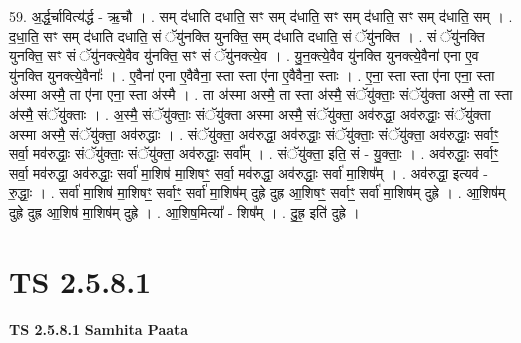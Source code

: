 \documentclass[17pt]{extarticle}
\begin{document}
59. अ॒र्द्ध॒र्चावित्य॑र्द्ध - ऋ॒चौ । . सम् द॑धाति दधाति॒ सꣳ सम् द॑धाति॒ सꣳ सम् द॑धाति॒ सꣳ सम् द॑धाति॒ सम् । . द॒धा॒ति॒ सꣳ सम् द॑धाति दधाति॒ सं ॅयु॑नक्ति युनक्ति॒ सम् द॑धाति दधाति॒ सं ॅयु॑नक्ति । . सं ॅयु॑नक्ति युनक्ति॒ सꣳ सं ॅयु॑नक्त्ये॒वैव यु॑नक्ति॒ सꣳ सं ॅयु॑नक्त्ये॒व । . यु॒न॒क्त्ये॒वैव यु॑नक्ति युनक्त्ये॒वैना॑ एना ए॒व यु॑नक्ति युनक्त्ये॒वैनाः᳚ । . ए॒वैना॑ एना ए॒वैवैना॒ स्ता स्ता ए॑ना ए॒वैवैना॒ स्ताः । . ए॒ना॒ स्ता स्ता ए॑ना एना॒ स्ता अ॑स्मा अस्मै॒ ता ए॑ना एना॒ स्ता अ॑स्मै । . ता अ॑स्मा अस्मै॒ ता स्ता अ॑स्मै॒ संॅयु॑क्ताः॒ संॅयु॑क्ता अस्मै॒ ता स्ता अ॑स्मै॒ संॅयु॑क्ताः । . अ॒स्मै॒ संॅयु॑क्ताः॒ संॅयु॑क्ता अस्मा अस्मै॒ संॅयु॑क्ता॒ अव॑रुद्धा॒ अव॑रुद्धाः॒ संॅयु॑क्ता अस्मा अस्मै॒ संॅयु॑क्ता॒ अव॑रुद्धाः । . संॅयु॑क्ता॒ अव॑रुद्धा॒ अव॑रुद्धाः॒ संॅयु॑क्ताः॒ संॅयु॑क्ता॒ अव॑रुद्धाः॒ सर्वाꣳ॒॒ सर्वा॒ मव॑रुद्धाः॒ संॅयु॑क्ताः॒ संॅयु॑क्ता॒ अव॑रुद्धाः॒ सर्वा᳚म् । . संॅयु॑क्ता॒ इति॒ सं - यु॒क्ताः॒ । . अव॑रुद्धाः॒ सर्वाꣳ॒॒ सर्वा॒ मव॑रुद्धा॒ अव॑रुद्धाः॒ सर्वा॑ मा॒शिष॑ मा॒शिषꣳ॒॒ सर्वा॒ मव॑रुद्धा॒ अव॑रुद्धाः॒ सर्वा॑ मा॒शिष᳚म् । . अव॑रुद्धा॒ इत्यव॑ - रु॒द्धाः॒ । . सर्वा॑ मा॒शिष॑ मा॒शिषꣳ॒॒ सर्वाꣳ॒॒ सर्वा॑ मा॒शिष॑म् दुह्रे दुह्र आ॒शिषꣳ॒॒ सर्वाꣳ॒॒ सर्वा॑ मा॒शिष॑म् दुह्रे । . आ॒शिष॑म् दुह्रे दुह्र आ॒शिष॑ मा॒शिष॑म् दुह्रे । . आ॒शिष॒मित्या᳚ - शिष᳚म् । . दु॒ह्र॒ इति॑ दुह्रे । \newline
\pagebreak
{}

\section{ TS 2.5.8.1 }

\textbf{TS 2.5.8.1 } \newline
\textbf{Samhita Paata} \newline
\end{document}
